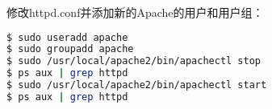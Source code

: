 修改httpd.conf并添加新的Apache的用户和用户组：


\begin{lstlisting}[language=bash]
$ sudo useradd apache
$ sudo groupadd apache
$ sudo /usr/local/apache2/bin/apachectl stop
$ ps aux | grep httpd
$ sudo /usr/local/apache2/bin/apachectl start
$ ps aux | grep httpd
\end{lstlisting}



\begin{lstlisting}[language=bash]

\end{lstlisting}



\begin{lstlisting}[language=bash]

\end{lstlisting}


\begin{lstlisting}[language=bash]

\end{lstlisting}



\begin{lstlisting}[language=bash]

\end{lstlisting}



\begin{lstlisting}[language=bash]

\end{lstlisting}



\begin{lstlisting}[language=bash]

\end{lstlisting}


\begin{lstlisting}[language=bash]

\end{lstlisting}


\begin{lstlisting}[language=bash]

\end{lstlisting}


\begin{lstlisting}[language=bash]

\end{lstlisting}



